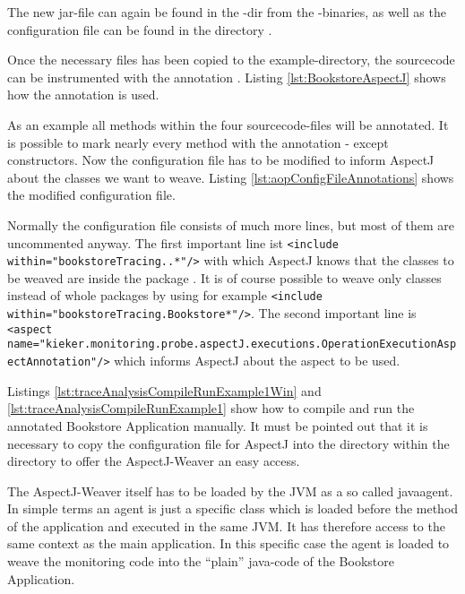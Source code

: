 The new jar-file  can again be found
in the -dir from the \Kieker{}-binaries, as well as the
configuration file \file{\aopConfigFile} can be found in the directory .

Once the necessary files has been copied to the example-directory,
the sourcecode can be instrumented with the annotation .
Listing \ref{lst:BookstoreAspectJ} shows how the annotation is
used.

\setJavaCodeListing


As an example all methods within the four sourcecode-files will be
annotated. It is possible to mark nearly every method with the annotation
- except constructors. Now the configuration file has to be modified to inform AspectJ about the classes we want to weave. Listing \ref{lst:aopConfigFileAnnotations} shows the modified configuration file.
\setXMLListing

Normally the configuration file consists of much more lines, but most of them are uncommented anyway. The first important line ist 
\lstinline$<include within="bookstoreTracing..*"/>$
with which AspectJ knows that the classes to be weaved are inside the package . It is of course possible to weave only classes instead of whole packages by using for example 
\lstinline$<include within="bookstoreTracing.Bookstore*"/>$. The second important line is 
\lstinline$<aspect name="kieker.monitoring.probe.aspectJ.executions.OperationExecutionAspectAnnotation"/>$ which informs AspectJ about the aspect to be used.

Listings \ref{lst:traceAnalysisCompileRunExample1Win} and \ref{lst:traceAnalysisCompileRunExample1} show how to compile and run the annotated Bookstore Application manually. It must be pointed out that it is necessary to copy the configuration file for AspectJ into the  directory within the  directory to offer the AspectJ-Weaver an easy access.

The AspectJ-Weaver itself has to be loaded by the JVM as a so called javaagent. In simple terms an agent is just a specific class which is loaded before the  method of the application and executed in the same JVM. It has therefore access to the same context as the main application. In this specific case the agent is loaded to weave the monitoring code into the ``plain'' java-code of the Bookstore Application.

